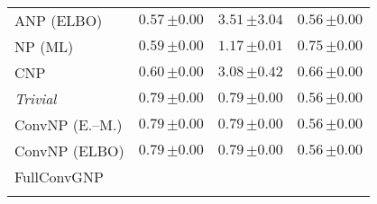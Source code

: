 \begin{tabular}[t]{lccc}
ANP (ELBO) & $0.57\,{ \scriptstyle \pm  0.00 }$ & $3.51\,{ \scriptstyle \pm  3.04 }$ & $0.56\,{ \scriptstyle \pm  0.00 }$ \\ 
NP (ML) & $0.59\,{ \scriptstyle \pm  0.00 }$ & $1.17\,{ \scriptstyle \pm  0.01 }$ & $0.75\,{ \scriptstyle \pm  0.00 }$ \\ 
CNP & $0.60\,{ \scriptstyle \pm  0.00 }$ & $3.08\,{ \scriptstyle \pm  0.42 }$ & $0.66\,{ \scriptstyle \pm  0.00 }$ \\ 
{\normalshape \textit{Trivial}} & $0.79\,{ \scriptstyle \pm  0.00 }$ & $0.79\,{ \scriptstyle \pm  0.00 }$ & $0.56\,{ \scriptstyle \pm  0.00 }$ \\ 
ConvNP (E.--M.) & $0.79\,{ \scriptstyle \pm  0.00 }$ & $0.79\,{ \scriptstyle \pm  0.00 }$ & $0.56\,{ \scriptstyle \pm  0.00 }$ \\ 
ConvNP (ELBO) & $0.79\,{ \scriptstyle \pm  0.00 }$ & $0.79\,{ \scriptstyle \pm  0.00 }$ & $0.56\,{ \scriptstyle \pm  0.00 }$ \\ 
FullConvGNP &  &  &  \\ 
\bottomrule \\ 
\end{tabular} 
